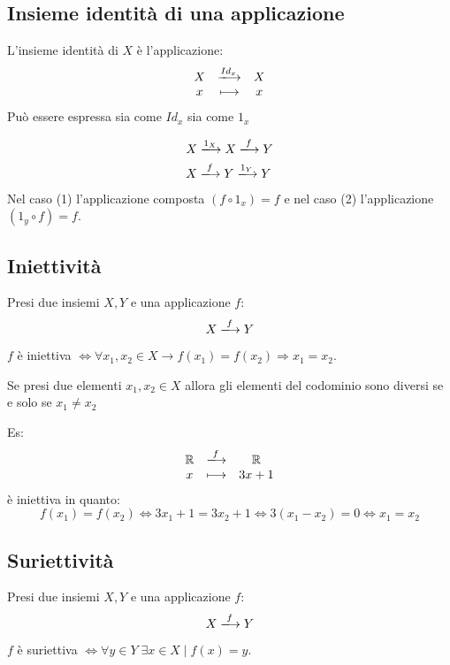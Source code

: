 \documentclass[a4paper,12pt]{article}
\begin{document}
	\subsection{Insieme identità di una applicazione}
	L'insieme identità di $X$ è l'applicazione:
	\[
	\begin{array}{c c c}
		X & \xlongrightarrow{Id_x} & X \\
		x & \longmapsto & x \\
	\end{array}
	\]
	Può essere espressa sia come $Id_x$ sia come $1_x$
	
	\setcounter{equation}{0}
	\begin{align}
		X & \xlongrightarrow{1_X} X \xlongrightarrow{f} Y \\
		X & \xlongrightarrow{f} Y \xlongrightarrow{1_Y} Y
	\end{align}
	Nel caso (1) l'applicazione composta $(f \circ 1_x) = f$ e nel caso (2) l'applicazione $(1_y \circ f) = f$.
	
	\subsection{Iniettività}
	Presi due insiemi $X, Y$ e una applicazione $f$:
	\[
	X \xlongrightarrow{f} Y
	\] 
	
	\begin{center}
		$f$ è iniettiva $\iff \forall x_1,x_2 \in X \rightarrow f(x_1) = f(x_2) \Rightarrow x_1 = x_2$.
	\end{center}
	
	Se presi due elementi $x_1, x_2 \in X$ allora gli elementi del codominio sono diversi se e solo se $x_1 \not = x_2$
	
	Es: 
	\[
	\begin{array}{c c c}
		\mathbb{R} & \xlongrightarrow{f} & \mathbb{R} \\
		x & \longmapsto & 3x + 1\\
	\end{array}
	\]
	è iniettiva in quanto:
	\[
	f(x_1) = f(x_2) \iff 3x_1 + 1 = 3x_2 + 1 \iff 3(x_1 - x_2) = 0 \iff x_1 = x_2
	\]
	
	\subsection{Suriettività}
	Presi due insiemi $X, Y$ e una applicazione $f$:
	\[
	X \xlongrightarrow{f} Y
	\] 
	
	\begin{center}
		$f$ è suriettiva $\iff \forall y \in Y \; \exists x\in X \mid f(x) = y$.
	\end{center}
	
\end{document}
